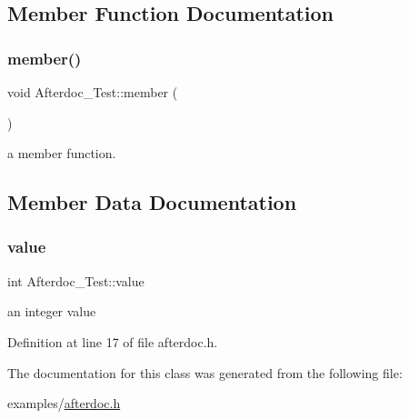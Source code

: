 \subsection{Member Function Documentation}
\mbox{\label{class_afterdoc___test_a57ba94e9039ee90a1b191ae0009a05dd}} 
\subsubsection{\texorpdfstring{member()}{member()}}
{\footnotesize\ttfamily void Afterdoc\+\_\+\+Test\+::member (\begin{DoxyParamCaption}{ }\end{DoxyParamCaption})}



a member function. 



\subsection{Member Data Documentation}
\mbox{\label{class_afterdoc___test_a9287a08830e5cdfd9c732bb7932694a0}} 
\subsubsection{\texorpdfstring{value}{value}}
{\footnotesize\ttfamily int Afterdoc\+\_\+\+Test\+::value\hspace{0.3cm}{\ttfamily [protected]}}

an integer value 

Definition at line 17 of file afterdoc.\+h.



The documentation for this class was generated from the following file\+:\begin{DoxyCompactItemize}
\item 
examples/\mbox{\hyperlink{afterdoc_8h}{afterdoc.\+h}}\end{DoxyCompactItemize}
